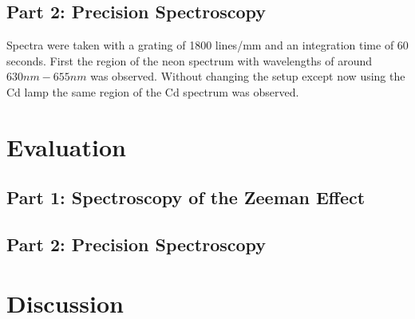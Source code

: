 \documentclass[12pt]{article}
\begin{document}
\subsection{Part 2: Precision Spectroscopy}
Spectra were taken with a grating of 1800 lines/mm and an integration time of 60 seconds. First the region of the neon spectrum with wavelengths of around $630nm-655nm$ was observed. Without changing the setup except now using the Cd lamp the same region of the Cd spectrum was observed. 
\section{Evaluation}
\subsection{Part 1: Spectroscopy of the Zeeman Effect}

\subsection{Part 2: Precision Spectroscopy}


\section{Discussion}
\end{document}
